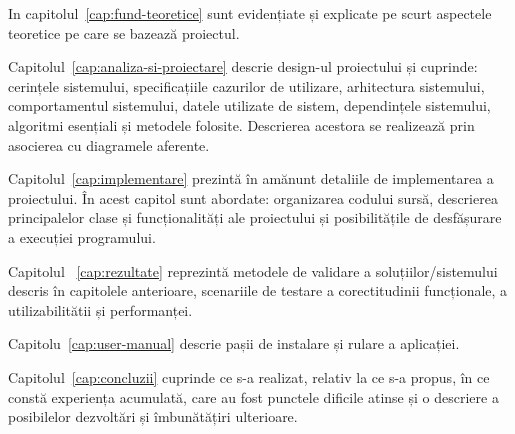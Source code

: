 In capitolul~\ref{cap:fund-teoretice}  sunt evidențiate și explicate pe scurt aspectele teoretice pe care se bazează proiectul.

Capitolul~\ref{cap:analiza-si-proiectare}  descrie design-ul proiectului și cuprinde: cerințele sistemului, specificațiile cazurilor de utilizare, arhitectura sistemului, comportamentul sistemului, datele utilizate de sistem, dependințele sistemului, algoritmi esențiali și metodele folosite. Descrierea acestora se realizează prin asocierea cu diagramele aferente.


Capitolul~\ref{cap:implementare}  prezintă în amănunt detaliile de implementarea a proiectului. În acest capitol sunt abordate: organizarea codului sursă, descrierea principalelor clase și funcționalități ale proiectului și posibilitățile de desfășurare a execuției programului. 

Capitolul ~\ref{cap:rezultate}  reprezintă metodele de validare a soluțiilor/sistemului descris în capitolele anterioare, scenariile de testare a corectitudinii funcționale, a utilizabilitătii și performanței. 

Capitolu~\ref{cap:user-manual} descrie pașii de instalare și rulare a aplicației.

Capitolul~\ref{cap:concluzii} cuprinde ce s-a realizat, relativ la ce s-a propus, în ce constă experiența acumulată, care au fost punctele dificile atinse și o descriere a posibilelor dezvoltări și îmbunătățiri ulterioare.
